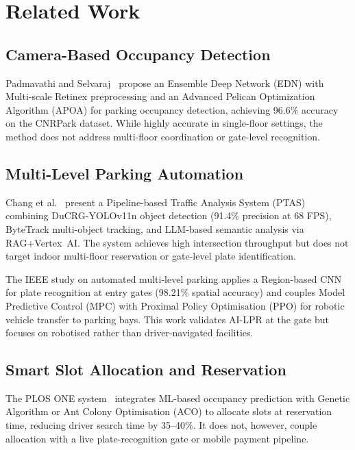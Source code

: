 \documentclass[runningheads]{llncs}
\begin{document}
\section{Related Work}
\label{sec:related}

\subsection{Camera-Based Occupancy Detection}

Padmavathi and Selvaraj~\cite{ref_padmavathi2024} propose an
Ensemble Deep Network (EDN) with Multi-scale Retinex
preprocessing and an Advanced Pelican Optimization Algorithm
(APOA) for parking occupancy detection, achieving 96.6\%
accuracy on the CNRPark dataset. While highly accurate in
single-floor settings, the method does not address
multi-floor coordination or gate-level recognition.

\subsection{Multi-Level Parking Automation}

Chang et al.~\cite{ref_chang2026} present a Pipeline-based
Traffic Analysis System (PTAS) combining DuCRG-YOLOv11n
object detection (91.4\% precision at 68 FPS), ByteTrack
multi-object tracking, and LLM-based semantic analysis via
RAG+Vertex~AI. The system achieves high intersection
throughput but does not target indoor multi-floor reservation
or gate-level plate identification.

The IEEE study on automated multi-level parking
\cite{ref_ieee_multilevel2024} applies a Region-based CNN
for plate recognition at entry gates (98.21\% spatial accuracy)
and couples Model Predictive Control (MPC) with Proximal
Policy Optimisation (PPO) for robotic vehicle transfer to
parking bays. This work validates AI-LPR at the gate but
focuses on robotised rather than driver-navigated facilities.

\subsection{Smart Slot Allocation and Reservation}

The PLOS ONE system~\cite{ref_plosone2025} integrates ML-based
occupancy prediction with Genetic Algorithm or Ant Colony
Optimisation (ACO) to allocate slots at reservation time,
reducing driver search time by 35--40\%. It does not, however,
couple allocation with a live plate-recognition gate or
mobile payment pipeline.
\end{document}
